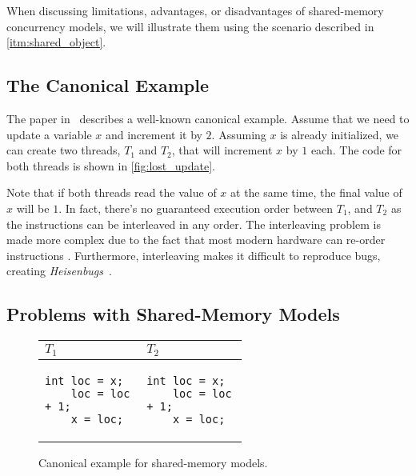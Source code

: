 When discussing limitations, advantages, or disadvantages of shared-memory concurrency models,
we will illustrate them using the scenario described in \autoref{itm:shared_object}.

\subsection{The Canonical Example}

The paper in~\cite{jaffe2011impactOfMemoryModels} describes a well-known canonical example.
Assume that we need to update a variable $x$ and increment it by $2$.
Assuming $x$ is already initialized, we can create two threads, $T_1$ and $T_2$, that will
increment $x$ by $1$ each. The code for both threads is shown in \autoref{fig:lost_update}.

Note that if both threads read the value of $x$ at the same time,
the final value of $x$ will be $1$. In fact, there's no guaranteed execution
order between $T_1$, and $T_2$ as the instructions can be interleaved
in any order. The interleaving problem is made more complex
due to the fact that most modern hardware can re-order instructions
\cite{huang2016debuggingConcurrentPrograms}. Furthermore, interleaving
makes it difficult to reproduce bugs, creating \textit{Heisenbugs}~\cite{rookout2021heisenbug,
gray1986whyComputersStop}.

\subsection{Problems with Shared-Memory Models}


\begin{figure}[!htp]
    \centering
    \begin{tabular}{|p{0.3\linewidth}|p{0.3\linewidth}|}
        \hline
        \textbf{$T_1$} & \textbf{$T_2$} \\
        \hline
        \begin{Verbatim}[fontsize=\small]
    int loc = x;
    loc = loc + 1;
    x = loc;
        \end{Verbatim}
        &
        \begin{Verbatim}[fontsize=\small]
    int loc = x;
    loc = loc + 1;
    x = loc;
        \end{Verbatim}
        \\
        \hline
    \end{tabular}
    \caption{Canonical example for shared-memory models.}
    \label{fig:lost_update}
\end{figure}

